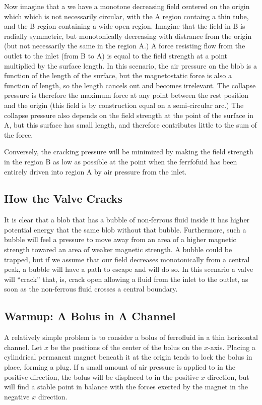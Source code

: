 \documentclass[]{asme2ej}
\begin{document}
Now imagine that a we have a monotone decreasing field centered
on the origin which which is not necessarily circular, with
the A region containg a thin tube, and the B region containing
a wide open region. Imagine that the field in B is radially
symmetric, but monotonically decreasing with distrance from
the origin (but not necessarily the same in the region A.)
A force resisting flow from the outlet to the inlet (from B to A)
is equal to the field strength at a point multiplied by the surface
length.
In this scenario, the air pressure on the blob is a function
of the length of the surface, but the magnetostatic force is
also a function of length, so the length cancels out and becomes
irrelevant.
The collapse pressure is therefore the maximum force at any point between the rest position and the origin
(this field is by construction equal on a semi-circular arc.)
The collapse pressure also depends on the field strength
at the point of the surface in A, but this surface has small length,
and therefore contributes little to the sum of the force.

Conversely, the cracking pressure will be minimized by
making the field strength in the region B as low as possible
at the point when the ferrfofuid has been entirely driven into
region A by air pressure from the inlet.

\subsection{How the Valve Cracks}

It is clear that a blob that has a bubble of non-ferrous fluid inside it
has higher potential energy that the same blob without that bubble.
Furthermore, such a bubble will feel a pressure to move away from
an area of a higher magnetic strength towared an area of weaker magnetic
strength. A bubble could be trapped, but if we assume that our
field decreases monotonically from a central peak, a bubble
will have a path to escape and will do so.
In this scenario a valve will ``crack'' that, is, crack open
allowing a fluid from the inlet to the outlet, as soon as the
non-ferrous fluid crosses a central boundary.


\subsection{Warmup: A Bolus in A Channel}

A relatively simple problem is to consider a bolus of
ferrofluid in a thin horizontal channel. Let $x$ be the positions of the center of
the bolus on the $x$-axis.
Placing a cylindrical permanent
magnet beneath it at the origin tends to lock the bolus in place,
forming a plug.
If a small amount of air pressure is applied to in the positive direction,
the bolus will
be displaced to in the positive $x$ direction, but will find a
stable point in balance with the forces exerted by the magnet in
the negative $x$ direction.
\end{document}

